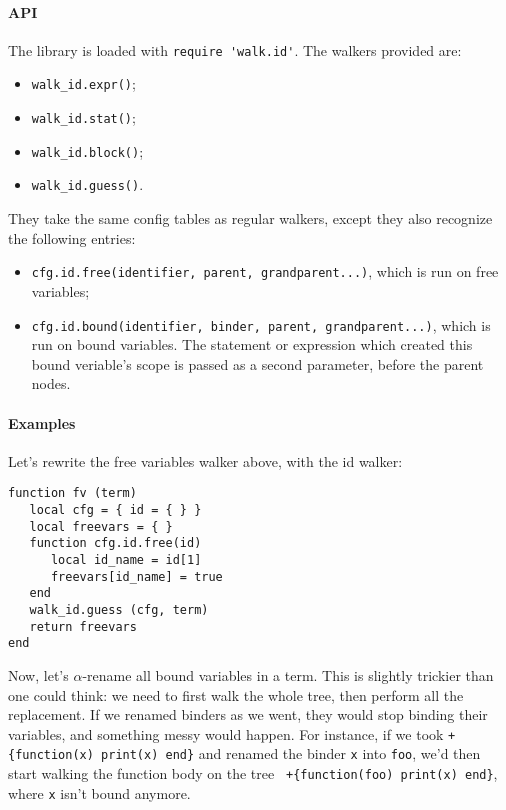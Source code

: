 \paragraph{API}
The library is loaded with \verb|require 'walk.id'|. The walkers provided are:
\begin{itemize}
\item {\tt walk\_id.expr()};
\item {\tt walk\_id.stat()};
\item {\tt walk\_id.block()};
\item {\tt walk\_id.guess()}.
\end{itemize}

They take the same config tables as regular walkers, except they also
recognize the following entries:
\begin{itemize}
\item {\tt cfg.id.free(identifier, parent, grandparent...)}, which is run on
  free variables;
\item {\tt cfg.id.bound(identifier, binder, parent, grandparent...)}, which is
  run on bound variables. The statement or expression which created this bound
  veriable's scope is passed as a second parameter, before the parent nodes.
\end{itemize}

\paragraph{Examples}
Let's rewrite the free variables walker above, with the id walker:

\begin{Verbatim}[fontsize=\scriptsize]
function fv (term)
   local cfg = { id = { } }
   local freevars = { }
   function cfg.id.free(id)
      local id_name = id[1]
      freevars[id_name] = true
   end
   walk_id.guess (cfg, term)
   return freevars
end
\end{Verbatim}

Now, let's $\alpha$-rename all bound variables in a term. This is slightly
trickier than one could think: we need to first walk the whole tree, then
perform all the replacement. If we renamed binders as we went, they would stop
binding their variables, and something messy would happen. For instance, if we
took {\tt +\{function(x) print(x) end\}} and renamed the binder {\tt x} into
{\tt foo}, we'd then start walking the function body on the tree {\tt
  +\{function(foo) print(x) end\}}, where {\tt x} isn't bound anymore.

